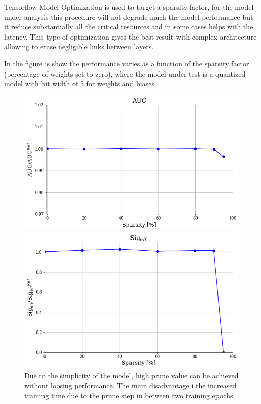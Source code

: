 \documentclass[../../main.tex]{subfiles}
\begin{document}
Tensorflow Model Optimization is used to target a sparsity factor, for the model under analysis this procedure will not degrade much the model performance but it reduce substantially all the critical resources and in some cases helps with the latency. This type of optimization gives the best result with complex architecture allowing to erase negligible links between layers.

In the figure is show the performance varies as a function of the sparsity factor (percentage of weights set to zero), where the model under test is a quantized model with bit width of 5 for weights and biases.

\begin{figure}[ht] 
  \label{ fig7} 
  \begin{minipage}[b]{0.5\linewidth}
    \centering
    \includegraphics[width=.95\linewidth]{sections/05/Images/Prune_AUC_1ele.png} 
    \vspace{4ex}
  \end{minipage}%
  \begin{minipage}[b]{0.5\linewidth}
    \centering
    \includegraphics[width=.95\linewidth]{sections/05/Images/Prune_SigEff_1ele.png}
    \vspace{4ex}
  \end{minipage}
  \caption{Due to the simplicity of the model, high prune value can be achieved without loosing performance. The main disadvantage i the increased training time due to the prune step in between two training epochs} 
  \label{fig:Prune_plots}
\end{figure}
\end{document}
